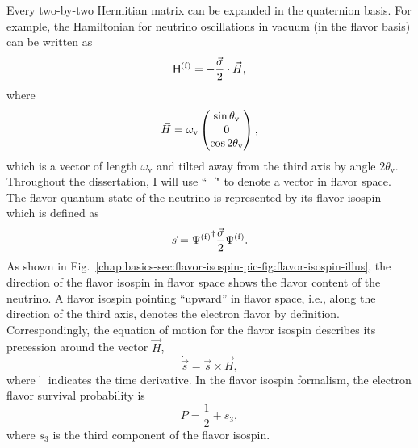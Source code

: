 Every two-by-two Hermitian matrix can be expanded in the quaternion basis. For example, the Hamiltonian for neutrino oscillations in vacuum (in the flavor basis) can be written as
\begin{equation}
\mathsf H^{(\mathrm f)} = - \frac{\vec{\sigma} }{2}\cdot {\vec{H}},
\end{equation}
where
\begin{align}
{\vec H} =  \omega_\mathrm v\begin{pmatrix}
 \sin \theta_\mathrm v\\
0\\
\cos 2\theta_{\mathrm v}
\end{pmatrix},
\end{align}
which is a vector of length $\omega_{\mathrm v}$ and tilted away from the third axis by angle $2\theta_{\mathrm v}$.
Throughout the dissertation, I will use ``$\vec{\phantom{x~}}$" to denote a vector in flavor space.
The flavor quantum state of the neutrino is represented by its flavor isospin which is defined as
\begin{equation}
    \vec s = {\Psi^{(\mathrm f)}}^{\dagger} \frac{\vec{\sigma} }{2} \Psi^{(\mathrm f)}.
\end{equation}
As shown in Fig.~\ref{chap:basics-sec:flavor-isospin-pic-fig:flavor-isospin-illus}, the direction of the flavor isospin in flavor space shows the flavor content of the neutrino. A flavor isospin pointing ``upward'' in flavor space, i.e., along the direction of the third axis, denotes the electron flavor by definition.
Correspondingly, the equation of motion for the flavor isospin describes its precession around the vector $\vec{H}$,
\begin{equation}
\dot{\vec{s}} = {\vec{s}} \times \vec{H},
\label{chap:basics-sec:flavor-isospin-pic-eqn:eom-precession}
\end{equation}
where $\dot{\phantom{s}}$ indicates the time derivative.
In the flavor isospin formalism, the electron flavor survival probability is
\begin{equation}
P = \frac{1}{2} + s_3,
\label{chap:basics-sec:flavor-isospin-pic-eqn:probability-flavor}
\end{equation}
where $s_3$ is the third component of the flavor isospin.
